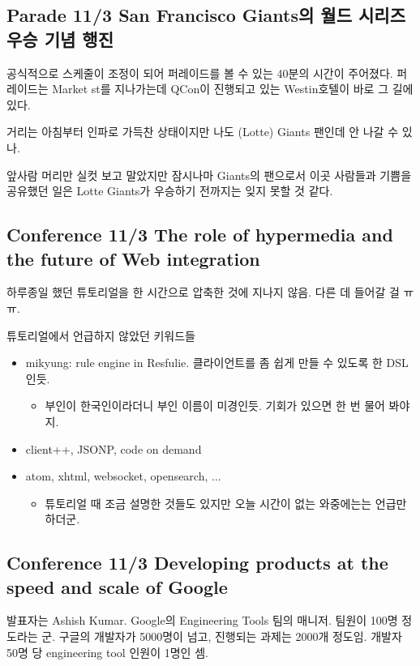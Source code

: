 \documentclass[a4paper]{article}
\begin{document}
\subsection{Parade 11/3 San Francisco Giants의 월드 시리즈 우승 기념 행진}
 
공식적으로 스케줄이 조정이 되어 퍼레이드를 볼 수 있는 40분의 시간이
주어졌다.  퍼레이드는 Market st를 지나가는데 QCon이 진행되고 있는
Westin호텔이 바로 그 길에 있다.
 
거리는 아침부터 인파로 가득찬 상태이지만 나도 (Lotte) Giants 팬인데 안
나갈 수 있나.
 
앞사람 머리만 실컷 보고 말았지만 잠시나마 Giants의 팬으로서 이곳
사람들과 기쁨을 공유했던 일은 Lotte Giants가 우승하기 전까지는 잊지
못할 것 같다.
 
\subsection{Conference 11/3 The role of hypermedia and the future of Web integration}
 
하루종일 했던 튜토리얼을 한 시간으로 압축한 것에 지나지 않음. 다른 데
들어갈 걸 ㅠㅠ.
 
튜토리얼에서 언급하지 않았던 키워드들
\begin{itemize}
\item mikyung: rule engine in Resfulie. 클라이언트를 좀 쉽게 만들 수
  있도록 한 DSL인듯.
  \begin{itemize}
  \item 부인이 한국인이라더니 부인 이름이 미경인듯. 기회가 있으면 한 번
    물어 봐야지.
  \end{itemize}
\item client++, JSONP, code on demand
\item atom, xhtml, websocket, opensearch, ...
  \begin{itemize}
  \item 튜토리얼 때 조금 설명한 것들도 있지만 오늘 시간이 없는
    와중에는는 언급만 하더군.
  \end{itemize}
\end{itemize}
 
\subsection{Conference 11/3 Developing products at the speed and scale of Google}
 
발표자는 Ashish Kumar. Google의 Engineering Tools 팀의 매니저. 팀원이
100명 정도라는 군.  구글의 개발자가 5000명이 넘고, 진행되는 과제는
2000개 정도임. 개발자 50명 당 engineering tool 인원이 1명인 셈.
 
\end{document}
